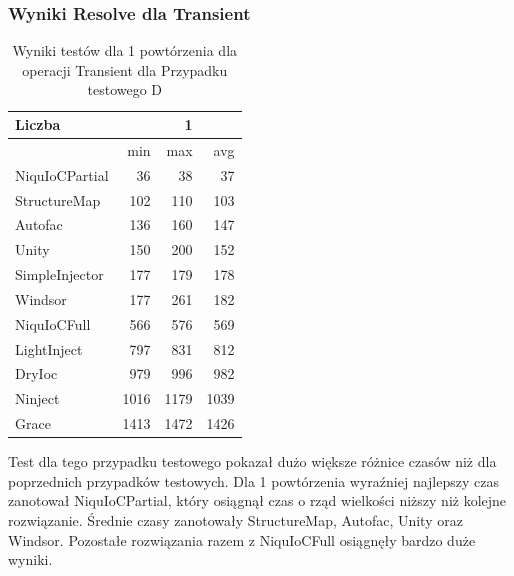 \documentclass[12pt]{article}
\begin{document}
\subsubsection{Wyniki Resolve dla Transient}
\begin{table}[H]
\captionsetup{belowskip=0pt,aboveskip=0pt}
\begin{center}
\begin{small}
	\begin{tabular}{ | l | r r r | }
    		\hline
Liczba & & 1 & \\ \hline
 & min & max & avg \\ \hline
NiquIoCPartial & 36 & 38 & 37 \\ \hline
StructureMap & 102 & 110 & 103 \\ \hline
Autofac & 136 & 160 & 147 \\ \hline
Unity & 150 & 200 & 152 \\ \hline
SimpleInjector & 177 & 179 & 178 \\ \hline
Windsor & 177 & 261 & 182 \\ \hline
NiquIoCFull & 566 & 576 & 569 \\ \hline
LightInject & 797 & 831 & 812 \\ \hline
DryIoc & 979 & 996 & 982 \\ \hline
Ninject & 1016 & 1179 & 1039 \\ \hline
Grace & 1413 & 1472 & 1426 \\ \hline
  	\end{tabular}
\end{small}
\end{center}
\caption{Wyniki testów dla 1 powtórzenia dla operacji Transient dla Przypadku testowego D}
\label{TestCaseD_Transient1}
\end{table}
Test dla tego przypadku testowego pokazał dużo większe różnice czasów niż dla poprzednich przypadków testowych. Dla 1 powtórzenia wyraźniej najlepszy czas zanotował NiquIoCPartial, który osiągnął czas o rząd wielkości niższy niż kolejne rozwiązanie. Średnie czasy zanotowały StructureMap, Autofac, Unity oraz Windsor. Pozostałe rozwiązania razem z NiquIoCFull osiągnęły  bardzo duże wyniki.
\\ \\
\end{document}
